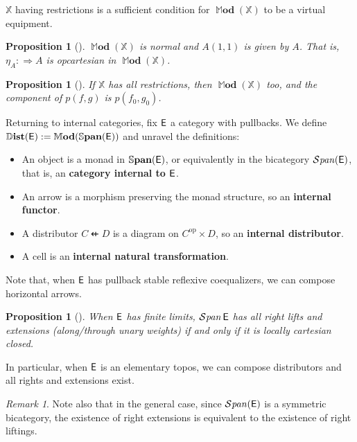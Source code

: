 \documentclass[10pt,a4paper]{article}
\newcommand{\bb}[1]{\mathbb{#1}}
\newcommand{\ca}[1]{\mathcal{#1}}
\newcommand{\cat}[1]{\textcat{#1}}
\newcommand{\textcat}[1]{{\normalfont\textsf{#1}}}
\newcommand{\To}{\Rightarrow}
\newcommand{\dfrom}{\nvleftarrow}
\newcommand{\op}{\mathrm{op}}
\DeclareMathOperator{\Dist}{\bb{D}\textbf{ist}}
\DeclareMathOperator{\Mod}{\bb{M}\textbf{od}}
\DeclareMathOperator{\Span}{\bb{S}\textbf{pan}}
\DeclareMathOperator{\bSpan}{\ca{S}\mathit{pan}}
\theoremstyle{plain}
\newtheorem{proposition}[theorem]{Proposition}
\theoremstyle{definition}
\theoremstyle{remark}
\newtheorem{remark}[theorem]{Remark}
\begin{document}
$\bb{X}$ having restrictions is a sufficient condition for $\Mod(\bb{X})$ to be a virtual equipment.

\begin{proposition}[{\cite[Proposition 5.5]{cs10}}]
    $\Mod(\bb{X})$ is normal and $A(1, 1)$ is given by $A$. That is, $\eta_A : \To A$ is opcartesian in $\Mod(\bb{X})$.
\end{proposition}

\begin{proposition}[{\cite[Proposition 7.4]{cs10}}]
    If $\bb{X}$ has all restrictions, then $\Mod(\bb{X})$ too, and the component of $p(f, g)$ is $p(f_0, g_0)$.
\end{proposition}

Returning to internal categories, fix $\cat{E}$ a category with pullbacks. We define $\Dist(\cat{E}) := \Mod(\Span(\cat{E}))$ and unravel the definitions:
\begin{itemize}
    \item An object is a monad in $\Span(\cat{E})$, or equivalently in the bicategory $\bSpan(\cat{E})$, that is, an \textbf{category internal to $\cat{E}$}.
    \item An arrow is a morphism preserving the monad structure, so an \textbf{internal functor}.
    \item A distributor $C \dfrom D$ is a diagram on $C^\op\times D$, so an \textbf{internal distributor}.
    \item A cell is an \textbf{internal natural transformation}.
\end{itemize}
 
Note that, when $\cat{E}$ has pullback stable reflexive coequalizers, we can compose horizontal arrows.

\begin{proposition}[{\cite[Proposition 4.1]{day_loccartclosed}}]
    When $\cat{E}$ has finite limits, $\bSpan\cat{E}$ has all right lifts and extensions (along/through unary weights) if and only if it is locally cartesian closed.
\end{proposition}

In particular, when $\cat{E}$ is an elementary topos, we can compose distributors and all rights and extensions exist.

\begin{remark}
    Note also that in the general case, since $\bSpan(\cat{E})$ is a symmetric bicategory, the existence of right extensions is equivalent to the existence of right liftings.
\end{remark}
\end{document}
